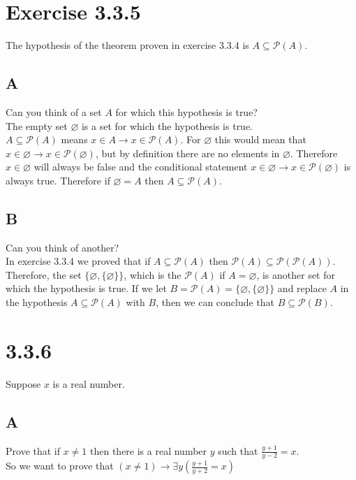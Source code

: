 \documentclass{article}
\newcommand{\n}{ \noindent }
\newcommand{\pwset}{\mathscr{P}}
\begin{document}
\section*{Exercise 3.3.5}
\n The hypothesis of the theorem proven in exercise 3.3.4 is $A \subseteq \pwset(A)$.
\subsection*{A}
\n Can you think of a set $A$ for which this hypothesis is true? \\

\n The empty set $\varnothing$ is a set for which the hypothesis is true. \\

\n $A \subseteq \pwset(A)$ means $x \in A \rightarrow x \in \pwset(A)$. For $\varnothing$ this would mean that $x \in \varnothing \rightarrow x \in \pwset(\varnothing)$, but by definition there are no elements in $\varnothing$. Therefore $x \in \varnothing$ will always be false and the conditional statement $x \in \varnothing \rightarrow x \in \pwset(\varnothing)$ is always true. Therefore if $\varnothing = A$ then $A \subseteq \pwset(A)$. 

\subsection*{B}
\n Can you think of another? \\

\n In exercise 3.3.4 we proved that if $A \subseteq \pwset(A)$ then $\pwset(A) \subseteq \pwset(\pwset(A))$. Therefore, the set $\{\varnothing, \{\varnothing\}\}$, which is the $\pwset(A)$ if $A = \varnothing$, is another set for which the hypothesis is true. If we let $B = \pwset(A) = \{\varnothing, \{\varnothing\}\}$ and replace $A$ in the hypothesis $A \subseteq \pwset(A)$ with $B$, then we can conclude that $B \subseteq \pwset(B)$.

\section*{3.3.6}
Suppose $x$ is a real number.
\subsection*{A}
Prove that if $x \neq 1$ then there is a real number $y$ such that $\tfrac{y+1}{y-2} = x$. \\

So we want to prove that $(x \neq 1) \rightarrow \exists y \left( \tfrac{y+1}{y+2} = x \right)$ \\
\end{document}
